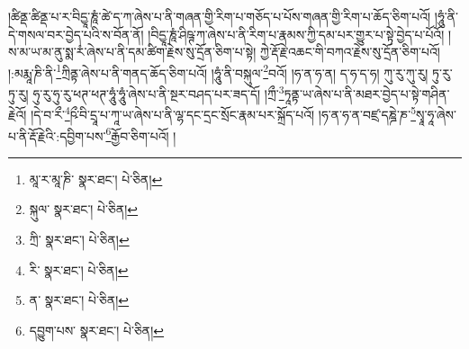 །ཚིནྡ་ཚིནྡ་པ་ར་བིདྱཱ་ཎཱཾ་ཚེ་ད་ཀ་ཞེས་པ་ནི་གཞན་གྱི་རིག་པ་གཅོད་པ་པོས་གཞན་གྱི་རིག་པ་ཆོད་ཅིག་པའོ། །ཧཱུཾ་ནི་དེ་གསལ་བར་བྱེད་པའི་ས་བོན་ནོ། །བིདྱཱ་ཎཱཾ་ཤིཥྚ་ཀ་ཞེས་པ་ནི་རིག་པ་རྣམས་ཀྱི་དམ་པར་གྱུར་པ་སྟེ་བྱེད་པ་པོའོ། །ས་མ་ཡ་མ་ནུ་སྨ་རཾ་ཞེས་པ་ནི་དམ་ཚིག་རྗེས་སུ་དྲོན་ཅིག་པ་སྟེ། ཀྱེ་རྡོ་རྗེ་འཆང་གི་བཀའ་རྗེས་སུ་དྲོན་ཅིག་པའོ། །:མརྨཱ་ཎི་ནི་\footnote{མཱ་ར་མཱ་ཎི་  སྣར་ཐང་།  པེ་ཅིན། }ཀྲིནྟ་ཞེས་པ་ནི་གནད་ཆོད་ཅིག་པའོ། །ཧཱུཾ་ནི་བསྐུལ་\footnote{སྐུལ་  སྣར་ཐང་།  པེ་ཅིན། }བའོ། །ཧ་ན་ཧ་ན། ད་ཧ་ད་ཧ། ཀུ་རུ་ཀུ་རུ། ཏུ་རུ་ཏུ་རུ། ཧུ་རུ་ཧུ་རུ་ཕཊ་ཕཊ་ཧཱུཾ་ཧཱུཾ་ཞེས་པ་ནི་སྔར་བཤད་པར་ཟད་དོ། །ཀྲྀ་\footnote{ཀྲི་  སྣར་ཐང་།  པེ་ཅིན། }ཏཱནྟ་ཡ་ཞེས་པ་ནི་མཐར་བྱེད་པ་སྟེ་གཤིན་རྗེའོ། །དེ་བ་རྀ་\footnote{རི་  སྣར་ཐང་།  པེ་ཅིན། }ཥྀ་བི་དྲཱ་པ་ཀཱ་ཡ་ཞེས་པ་ནི་ལྷ་དང་དྲང་སྲོང་རྣམ་པར་སྐྲོད་པའོ། །ཧ་ན་ཧ་ན་བཛྲ་དཎྜེ་ཎ་\footnote{ན་  སྣར་ཐང་།  པེ་ཅིན། }སྭཱ་ཧཱ་ཞེས་པ་ནི་རྡོ་རྗེའི་:དབྱིག་པས་\footnote{དབྱུག་པས་  སྣར་ཐང་།  པེ་ཅིན། }རྒྱོབ་ཅིག་པའོ། །
